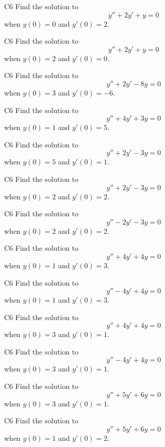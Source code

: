 \begin{problem}{C6}
Find the solution to
\[
y'' + 2y' + y = 0 
\]
when \(y(0)=0\) and \(y'(0)=2\).
\end{problem}

\begin{problem}{C6}
Find the solution to
\[
y'' + 2y' + y = 0 
\]
when \(y(0)=2\) and \(y'(0)=0\).
\end{problem}

\begin{problem}{C6}
Find the solution to
\[
y'' + 2y' - 8y = 0
\]
when \(y(0)=3\) and \(y'(0)=-6\).
\end{problem}

\begin{problem}{C6}
Find the solution to
\[
y'' + 4y' + 3y = 0
\]
when \(y(0)=1\) and \(y'(0)=5\).
\end{problem}

\begin{problem}{C6}
Find the solution to
\[
y'' + 2y' - 3y = 0
\]
when \(y(0)=5\) and \(y'(0)=1\).
\end{problem}

\begin{problem}{C6}
Find the solution to
\[
y'' + 2y' - 3y = 0
\]
when \(y(0)=2\) and \(y'(0)=2\).
\end{problem}

\begin{problem}{C6}
Find the solution to
\[
y'' - 2y' - 3y = 0
\]
when \(y(0)=2\) and \(y'(0)=2\).
\end{problem}

\begin{problem}{C6}
Find the solution to
\[
y'' + 4y' + 4y = 0
\]
when \(y(0)=1\) and \(y'(0)=3\).
\end{problem}

\begin{problem}{C6}
Find the solution to
\[
y'' - 4y' + 4y = 0
\]
when \(y(0)=1\) and \(y'(0)=3\).
\end{problem}

\begin{problem}{C6}
Find the solution to
\[
y'' + 4y' + 4y = 0
\]
when \(y(0)=3\) and \(y'(0)=1\).
\end{problem}

\begin{problem}{C6}
Find the solution to
\[
y'' - 4y' + 4y = 0
\]
when \(y(0)=3\) and \(y'(0)=1\).
\end{problem}

\begin{problem}{C6}
Find the solution to
\[
y'' + 5y' + 6y = 0
\]
when \(y(0)=3\) and \(y'(0)=1\).
\end{problem}

\begin{problem}{C6}
Find the solution to
\[
y'' + 5y' + 6y = 0
\]
when \(y(0)=1\) and \(y'(0)=2\).
\end{problem}

